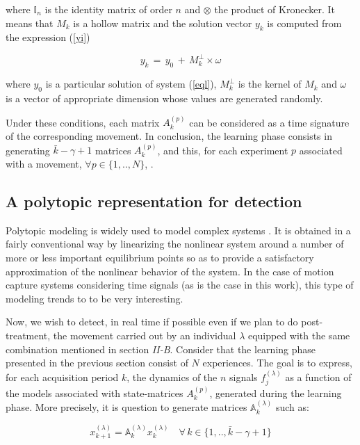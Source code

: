 \documentclass[letterpaper, 10 pt, conference]{ieeeconf}  %
\newcommand{\mA}{{\mathbb A}}
\newcommand{\mI}{{\mathbb I}}
\begin{document}
where $\mI_n$ is the identity matrix of order $n$ and $\otimes$ the product of Kronecker. It means that $M_k$ is a hollow matrix and the solution vector $y_k$ is computed from the expression  (\ref{yi}) 
		 
\begin{equation}
		\label{yi}
		y_k\,=\,y_0\,+\,M_k^\perp \times \omega
		 \end{equation}		 

where $y_0$ is a particular solution of system (\ref{eql}), $M_k^\perp$ is the kernel of $M_k$ and $\omega$ is a vector of appropriate dimension whose values are generated randomly.

Under these conditions, each matrix $A_k^{(p)}$ can be considered as a time signature of the corresponding movement. In conclusion, the learning phase consists in generating $\bar{k}-\gamma+1$ matrices $A_k^{(p)}$, and this, for each experiment $p$ associated with a movement, $ \forall p\in \{1,..,N\}$, .

\subsection{A polytopic representation for detection}

Polytopic modeling is widely used to model complex systems \cite{ber89}. It is obtained in a fairly conventional way by linearizing the nonlinear system around a number of more or less important equilibrium points so as to provide a satisfactory approximation of the nonlinear behavior of the system. In the case of motion capture systems considering time signals (as is the case in this work), this type of modeling trends to to be very interesting.

Now, we wish to detect, in real time if possible even if we plan to do post-treatment, the movement carried out by an individual $\lambda$ equipped with the same combination mentioned in section \textit{II-B}. Consider that the learning phase presented in the previous section consist of $N$ experiences. The goal is to express, for each acquisition period $k$, the dynamics of the $n$ signals $f_j^{(\lambda)}$ as a function of the models associated with state-matrices $A_k^{(p)}$, generated during the learning phase. More precisely, it is question to generate matrices  $\mA_k^{(\lambda)}$ such as:

\begin{equation}
\label{eq:sssw2}
x_{k+1}^{(\lambda)}=\mA_k^{(\lambda)}x_{k}^{(\lambda)}\quad \forall \, k\in \{1,..,\bar{k}-\gamma+1\}
\end{equation}
\end{document}
